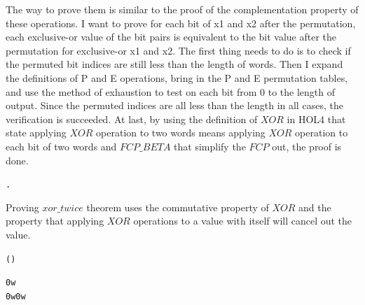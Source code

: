 \documentclass{article}
\begin{document}
\begin{alltt}
  
\end{alltt}

\begin{alltt}
  
\end{alltt}

The way to prove them is similar to the proof of the complementation property of these operations. I want to prove for each
bit of x1 and x2 after the permutation, each exclusive-or value of the bit pairs is equivalent to the bit value after the
permutation for exclusive-or x1 and x2. The first thing needs to do is to check if the permuted bit indices
are still less than the length of words. Then I expand the definitions of P and E operations, bring in the P and E permutation
tables, and use the method of exhaustion to test on each bit from 0 to the length of output. Since the permuted indices are all
less than the length in all cases, the verification is succeeded. At last, by using the definition of $XOR$ in HOL4 that
state applying $XOR$ operation to two words means applying $XOR$ operation to each bit of two words and $FCP\_BETA$ that simplify
the $FCP$ out, the proof is done.

\begin{alltt}
  \HOLTokenTurnstile{}  \HOLSymConst{\HOLTokenEor{}}  \HOLSymConst{=}  .    \HOLSymConst{\HOLTokenNotEquiv{}}   
\end{alltt}

Proving $xor\_twice$ theorem uses the commutative property of $XOR$ and the property that applying $XOR$ operations
to a value with itself will cancel out the value.

\begin{alltt}
  \HOLTokenTurnstile{} ( \HOLSymConst{\HOLTokenEor{}} ) \HOLSymConst{\HOLTokenEor{}}  \HOLSymConst{=}  \HOLSymConst{\HOLTokenEor{}}  \HOLSymConst{\HOLTokenEor{}} 
\end{alltt}

\begin{alltt}
  \HOLTokenTurnstile{}  \HOLSymConst{\HOLTokenEor{}}  \HOLSymConst{=} \HOLSymConst{\HOLTokenNeg{}} \HOLSymConst{\HOLTokenConj{}}  \HOLSymConst{\HOLTokenEor{}}  \HOLSymConst{=} \HOLSymConst{\HOLTokenNeg{}} \HOLSymConst{\HOLTokenConj{}} 0w \HOLSymConst{\HOLTokenEor{}}  \HOLSymConst{=}  \HOLSymConst{\HOLTokenConj{}}
    \HOLSymConst{\HOLTokenEor{}} 0w \HOLSymConst{=}  \HOLSymConst{\HOLTokenConj{}}  \HOLSymConst{\HOLTokenEor{}}  \HOLSymConst{=} 0w
\end{alltt}
\end{document}
